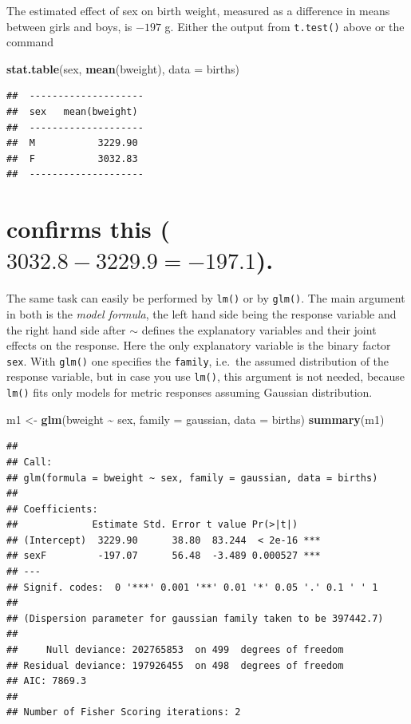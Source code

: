 \documentclass[
]{book}
\newenvironment{Shaded}{\begin{snugshade}}{\end{snugshade}}
\newcommand{\AttributeTok}[1]{\textcolor[rgb]{0.13,0.29,0.53}{#1}}
\newcommand{\FunctionTok}[1]{\textcolor[rgb]{0.13,0.29,0.53}{\textbf{#1}}}
\newcommand{\NormalTok}[1]{#1}
\newcommand{\OtherTok}[1]{\textcolor[rgb]{0.56,0.35,0.01}{#1}}
\newcommand{\SpecialCharTok}[1]{\textcolor[rgb]{0.81,0.36,0.00}{\textbf{#1}}}
\begin{document}
The estimated effect of sex on birth weight, measured as a difference
in means between girls and boys,
is \(-197\) g.
Either the output from \texttt{t.test()} above or the command

\begin{Shaded}
\begin{Highlighting}[]
\FunctionTok{stat.table}\NormalTok{(sex, }\FunctionTok{mean}\NormalTok{(bweight), }\AttributeTok{data =}\NormalTok{ births)}
\end{Highlighting}
\end{Shaded}

\begin{verbatim}
##  -------------------- 
##  sex   mean(bweight)  
##  -------------------- 
##  M           3229.90  
##  F           3032.83  
##  --------------------
\end{verbatim}

\section{\texorpdfstring{confirms this (\(3032.8-3229.9=-197.1\)).}{confirms this (3032.8-3229.9=-197.1).}}\label{confirms-this-3032.8-3229.9-197.1.}

The same task can easily be performed by \texttt{lm()} or by \texttt{glm()}. The main argument in both
is the \emph{model formula}, the left hand side being the response variable and the right hand side
after \(\sim\) defines the explanatory variables and their
joint effects on the response. Here the only
explanatory variable is the binary factor \texttt{sex}. With \texttt{glm()} one specifies the
\texttt{family}, i.e.~the assumed distribution of the response variable, but in case you use
\texttt{lm()}, this argument is not needed, because \texttt{lm()} fits only models for metric responses
assuming Gaussian distribution.

\begin{Shaded}
\begin{Highlighting}[]
\NormalTok{m1 }\OtherTok{\textless{}{-}} \FunctionTok{glm}\NormalTok{(bweight }\SpecialCharTok{\textasciitilde{}}\NormalTok{ sex, }\AttributeTok{family =}\NormalTok{ gaussian, }\AttributeTok{data =}\NormalTok{ births)}
\FunctionTok{summary}\NormalTok{(m1)}
\end{Highlighting}
\end{Shaded}

\begin{verbatim}
## 
## Call:
## glm(formula = bweight ~ sex, family = gaussian, data = births)
## 
## Coefficients:
##             Estimate Std. Error t value Pr(>|t|)    
## (Intercept)  3229.90      38.80  83.244  < 2e-16 ***
## sexF         -197.07      56.48  -3.489 0.000527 ***
## ---
## Signif. codes:  0 '***' 0.001 '**' 0.01 '*' 0.05 '.' 0.1 ' ' 1
## 
## (Dispersion parameter for gaussian family taken to be 397442.7)
## 
##     Null deviance: 202765853  on 499  degrees of freedom
## Residual deviance: 197926455  on 498  degrees of freedom
## AIC: 7869.3
## 
## Number of Fisher Scoring iterations: 2
\end{verbatim}
\end{document}
